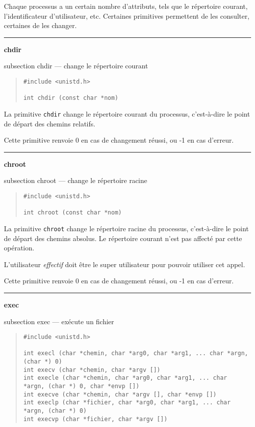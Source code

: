 \documentclass [twoside] {report}
\newcommand {\primitive} [1]
    {
	{\large \bf #1}
	\addcontentsline {toc} {subsection} {#1}
    }
\newcommand {\separation}
    {
	\vspace {7mm}
	\nopagebreak
	\hrule
    }
\begin{document}
Chaque processus a un certain nombre
d'attributs, tels que le répertoire courant,
l'identificateur d'utilisateur, etc. Certaines
primitives permettent de les consulter, certaines
de les changer.


\separation
\primitive {chdir} --- change le répertoire courant

\begin {quote}
\begin {verbatim}
#include <unistd.h>

int chdir (const char *nom)
\end{verbatim}
\end {quote}

La primitive {\tt chdir} change le répertoire
courant du processus, c'est-à-dire le point de
départ des chemins relatifs.

Cette primitive renvoie 0 en cas de changement
réussi, ou -1 en cas d'erreur.




\separation
\primitive {chroot} --- change le répertoire racine

\begin {quote}
\begin {verbatim}
#include <unistd.h>

int chroot (const char *nom)
\end{verbatim}
\end {quote}

La primitive {\tt chroot} change le répertoire
racine du processus, c'est-à-dire le point de
départ des chemins absolus. Le répertoire courant
n'est pas affecté par cette opération.

L'utilisateur {\em effectif} doit être le super
utilisateur pour pouvoir utiliser cet appel.

Cette primitive renvoie 0 en cas de changement
réussi, ou -1 en cas d'erreur.




\separation
\primitive {exec} --- exécute un fichier

\begin {quote}
\begin {verbatim}
#include <unistd.h>

int execl (char *chemin, char *arg0, char *arg1, ... char *argn, (char *) 0)
int execv (char *chemin, char *argv [])
int execle (char *chemin, char *arg0, char *arg1, ... char *argn, (char *) 0, char *envp [])
int execve (char *chemin, char *argv [], char *envp [])
int execlp (char *fichier, char *arg0, char *arg1, ... char *argn, (char *) 0)
int execvp (char *fichier, char *argv [])
\end{verbatim}
\end {quote}
\end{document}
